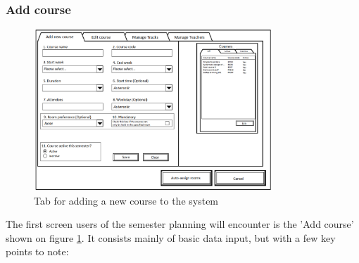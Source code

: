 \subsubsection{Add course}
\begin{figure}[htb]
\begin{center}
\leavevmode
\includegraphics[width=0.8\textwidth]{images/courseplan2_addcourse}
\end{center}
\caption{Tab for adding a new course to the system}
\label{fig:courseplan2_addcourse}
\end{figure}
The first screen users of the semester planning will encounter is the 'Add course' shown on figure \ref{fig:courseplan2_addcourse}. It consists mainly of basic data input, but with a few key points to note:
